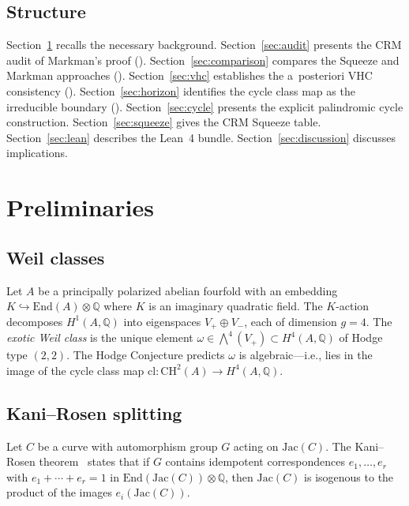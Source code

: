 \documentclass[11pt]{article}
\theoremstyle{plain}
\theoremstyle{definition}
\theoremstyle{remark}
\newcommand{\QQ}{\mathbb{Q}}
\newcommand{\End}{\mathrm{End}}
\newcommand{\Jac}{\mathrm{Jac}}
\newcommand{\CH}{\mathrm{CH}}
\begin{document}
\subsection{Structure}

Section~\ref{sec:prelim} recalls the necessary background.
Section~\ref{sec:audit} presents the CRM audit of Markman's proof
().  Section~\ref{sec:comparison} compares the Squeeze
and Markman approaches ().  Section~\ref{sec:vhc}
establishes the a~posteriori VHC consistency ().
Section~\ref{sec:horizon} identifies the cycle class map as the
irreducible boundary ().  Section~\ref{sec:cycle}
presents the explicit palindromic cycle construction.
Section~\ref{sec:squeeze} gives the CRM Squeeze table.
Section~\ref{sec:lean} describes the Lean~4 bundle.
Section~\ref{sec:discussion} discusses implications.

\section{Preliminaries}\label{sec:prelim}

\subsection{Weil classes}

Let $A$ be a principally polarized abelian fourfold with an
embedding $K \hookrightarrow \End(A) \otimes \QQ$ where $K$ is an
imaginary quadratic field.  The $K$-action decomposes $H^1(A, \QQ)$
into eigenspaces $V_+ \oplus V_-$, each of dimension $g = 4$.  The
\emph{exotic Weil class} is the unique element
$\omega \in \bigwedge^4(V_+) \subset H^4(A, \QQ)$ of Hodge type
$(2,2)$.  The Hodge Conjecture predicts $\omega$ is algebraic---i.e.,
lies in the image of the cycle class map $\mathrm{cl}: \CH^2(A) \to
H^4(A, \QQ)$.

\subsection{Kani--Rosen splitting}

Let $C$ be a curve with automorphism group $G$ acting on
$\Jac(C)$.  The Kani--Rosen theorem~\cite{kani-rosen} states that if
$G$ contains idempotent correspondences $e_1, \ldots, e_r$ with
$e_1 + \cdots + e_r = 1$ in $\End(\Jac(C)) \otimes \QQ$, then
$\Jac(C)$ is isogenous to the product of the images
$e_i(\Jac(C))$.
\end{document}
